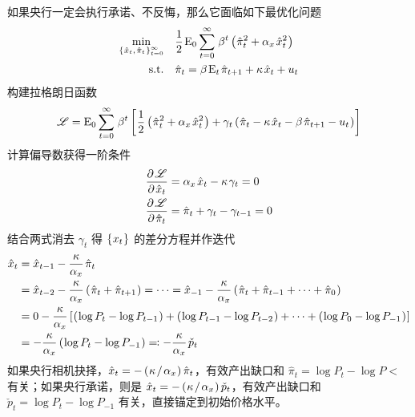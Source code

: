 如果央行一定会执行承诺、不反悔，那么它面临如下最优化问题
\begin{align*}
    \min_{\bkd{\hat x_t,\,\hat\pi_t}^\infty_{t=0}}
    \quad &
    \dfrac12\,\meano\sum_{t=0}^\infty\, \beta^t\bka{\hat \pi_t^2+\alpha_x\,\hat x_t^2}\\
    \n{s.t.}
    \quad &
    \hat \pi_t=\beta\,\meant\,\hat\pi\nt+\kappa\,\hat x_t+u_t
\end{align*}
构建拉格朗日函数
\begin{align*}
    \mathscr L=\meano\sum_{t=0}^\infty\, \beta^t\bks{\dfrac12\bka{\hat\pi_t^2+\alpha_x\,\hat x^2_t}+\gamma_t\bka{\hat\pi_t-\kappa\,\hat x_t-\beta\,\hat\pi\nt-u_t}}
\end{align*}
计算偏导数获得一阶条件
\begin{align*}
    & \dfrac{\p\scr L}{\p \hat x_t} = \alpha_x\,\hat x_t-\kappa\,\gamma_t = 0 \\
    & \dfrac{\p\scr L}{\p \hat\pi_t} = \hat\pi_t+\gamma_t-\gamma\lt = 0
\end{align*}
结合两式消去 \(\gamma_t\) 得 \(\left\{\mspace{1mu} x_t\mspace{1mu}\right\}\) 的差分方程并作迭代
\begin{align*}
    \hat x_t &= \hat x\lt - \dfrac\kappa{\alpha_x}\,\hat\pi_t\\
    &= \hat x\llt - \dfrac\kappa{\alpha_x}\bka{\hat\pi_t+\hat\pi\nt}=\cdots= \hat x_{-1} - \dfrac\kappa{\alpha_x}\bka{\hat\pi_t+\hat\pi\lt+\cdots+\hat\pi_0}\\
    &= 0 - \dfrac\kappa{\alpha_x}\bks{\bka{\log P_t-\log P\lt}+\bka{\log P\lt-\log P\llt}+\cdots+\bka{\log P_0-\log P_{-1}}}\\
    &=-\dfrac\kappa{\alpha_x}\bka{\log P_t-\log P_{-1}}\eqcolon-\dfrac\kappa{\alpha_x}\,\check p_t
\end{align*}
如果央行相机抉择，\(\hat x_t=-\left(\mspace{1mu}\kappa{\mspace{2mu}}/{\mspace{2mu}}\alpha_x\mspace{1mu}\right)\hat\pi_t\)，有效产出缺口和 \(\hat \pi_t=\log P_t-\log P\lt\) 有关；如果央行承诺，则是 \(\hat x_t=-\left(\mspace{1mu}\kappa{\mspace{2mu}}/{\mspace{2mu}}\alpha_x\mspace{1mu}\right)\check p_t\)，有效产出缺口和 \(\check p_t=\log P_t-\log P_{-1}\) 有关，直接锚定到初始价格水平。

